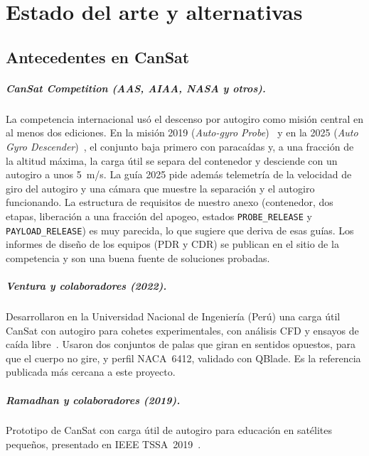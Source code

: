 \chapter{Estado del arte y alternativas}\label{cap:arte}

\section{Antecedentes en CanSat}

\paragraph{CanSat Competition (AAS, AIAA, NASA y otros).} La competencia internacional usó
el descenso por autogiro como misión central en al menos dos ediciones. En la misión 2019
(\emph{Auto-gyro Probe})~\cite{cansat2019} y en la 2025 (\emph{Auto Gyro
Descender})~\cite{cansat2025}, el conjunto baja primero con paracaídas y, a una fracción
de la altitud máxima, la carga útil se separa del contenedor y desciende con un autogiro a
unos \SI{5}{m/s}. La guía 2025 pide además telemetría de la velocidad de giro del autogiro
y una cámara que muestre la separación y el autogiro funcionando. La estructura de
requisitos de nuestro anexo (contenedor, dos etapas, liberación a una fracción del apogeo,
estados \texttt{PROBE\_RELEASE} y \texttt{PAYLOAD\_RELEASE}) es muy parecida, lo que
sugiere que deriva de esas guías. Los informes de diseño de los equipos (PDR y CDR) se
publican en el sitio de la competencia y son una buena fuente de soluciones probadas.

\paragraph{Ventura y colaboradores (2022).} Desarrollaron en la Universidad Nacional de
Ingeniería (Perú) una carga útil CanSat con autogiro para cohetes experimentales, con
análisis CFD y ensayos de caída libre~\cite{ventura2022}. Usaron dos conjuntos de palas
que giran en sentidos opuestos, para que el cuerpo no gire, y perfil NACA~6412, validado
con QBlade. Es la referencia publicada más cercana a este proyecto.

\paragraph{Ramadhan y colaboradores (2019).} Prototipo de CanSat con carga útil de
autogiro para educación en satélites pequeños, presentado en IEEE TSSA~2019~\cite{ramadhan2019}.


